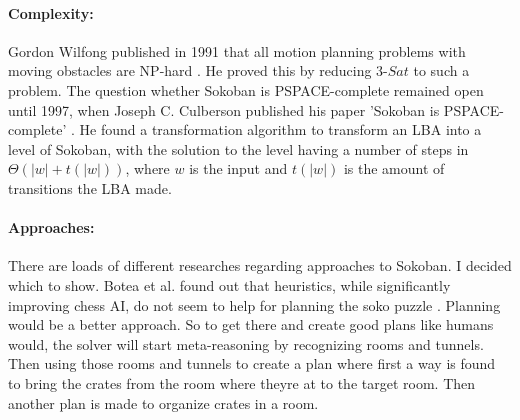 \documentclass[12pt,a4paper,oneside]{report}
\begin{document}
\paragraph{Complexity:} Gordon Wilfong published in 1991 that all motion planning problems with moving obstacles are NP-hard \cite{WilfongNPhard}. He proved this by reducing $3$-$Sat$ to such a problem. The question whether Sokoban is PSPACE-complete remained open until 1997, when Joseph C. Culberson published his paper 'Sokoban is PSPACE-complete' \cite{PSpaceComplete}. He found a transformation algorithm to transform an LBA into a level of Sokoban, with the solution to the level having a number of steps in $\Theta (|w|+t(|w|))$, where $w$ is the input and $t(|w|)$ is the amount of transitions the LBA made.
\paragraph{Approaches:} There are loads of different researches regarding approaches to Sokoban. I decided which to show. Botea et al. found out that heuristics, while significantly improving chess AI, do not seem to help for planning the soko puzzle \cite{BoteaHeuristicsVsPlanning}. Planning would be a better approach. So to get there and create good plans like humans would, the solver will start meta-reasoning by recognizing rooms and tunnels. Then using those rooms and tunnels to create a plan where first a way is found to bring the crates from the room where theyre at to the target room. Then another plan is made to organize crates in a room.
\end{document}
